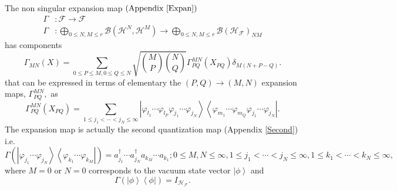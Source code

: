 \documentclass[aps,preprint]{revtex4}%
\begin{document}
The non singular expansion map \cite{weiner2011}\cite{Kummar} $\left(
\text{Appendix \ref{Expan}}\right)  $
\begin{align}
\Gamma &  :\mathcal{F\rightarrow F}\nonumber\\
\Gamma &  :%
{\displaystyle\bigoplus\limits_{0\leq N,M\leq r}}
\mathcal{B}\left(  \mathcal{H}^{N},\mathcal{H}^{M}\right)
\mathcal{\rightarrow}%
{\displaystyle\bigoplus\limits_{0\leq N,M\leq r}}
\mathcal{B}\left(  \mathcal{H}_{\mathcal{F}}\right)  _{NM}%
\end{align}
has components
\begin{equation}
\Gamma_{MN}\left(  X\right)  =\sum_{0\leq P\leq M,0\leq Q\leq N}\sqrt
{\binom{M}{P}\binom{N}{Q}}\Gamma_{PQ}^{MN}\left(  X_{PQ}\right)
\delta_{M\left(  N+P-Q\right)  }.
\end{equation}
that can be expressed in terms of elementary the $\left(  P,Q\right)
\rightarrow\left(  M,N\right)  $ expansion maps, $\Gamma_{PQ}^{MN},$ as
\begin{equation}
\Gamma_{PQ}^{MN}\left(  X_{PQ}\right)  =\sum_{1\leq j_{1}<\cdots<j_{N}%
\leq\infty}\left\vert \varphi_{l_{1}}\cdots\varphi_{l_{P}}\varphi_{j_{1}%
}\cdots\varphi_{j_{N}}\right\rangle \left\langle \varphi_{m_{1}}\cdots
\varphi_{m_{Q}}\varphi_{j_{1}}\cdots\varphi_{j_{N}}\right\vert .
\end{equation}
The expansion map is actually the second quantization map (Appendix
\ref{Second}) i.e.
\begin{equation}
\Gamma\left(  \left\vert \varphi_{j_{1}}\cdots\varphi_{j_{N}}\right\rangle
\left\langle \varphi_{k_{1}}\cdots\varphi_{k_{M}}\right\vert \right)
=a_{j_{1}}^{\dagger}\cdots a_{j_{N}}^{\dagger}a_{k_{M}}\cdots a_{k_{1}};0\leq
M,N\leq\infty,1\leq j_{1}<\cdots<j_{N}\leq\infty,1\leq k_{1}<\cdots<k_{N}%
\leq\infty,
\end{equation}
where $M=0$ or $N=0$ corresponds to the vacuum state vector $\left\vert
\phi\right\rangle $ and
\begin{equation}
\Gamma\left(  \left\vert \phi\right\rangle \left\langle \phi\right\vert
\right)  =I_{\mathcal{H}_{\mathcal{F}}}.
\end{equation}
\end{document}
